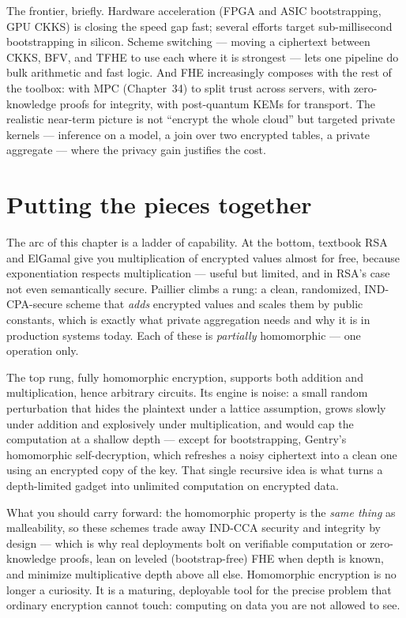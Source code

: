 \begin{focusbox}
The frontier, briefly. Hardware acceleration (FPGA and ASIC bootstrapping, GPU CKKS) is closing the speed gap fast; several efforts target sub-millisecond bootstrapping in silicon. Scheme switching --- moving a ciphertext between CKKS, BFV, and TFHE to use each where it is strongest --- lets one pipeline do bulk arithmetic and fast logic. And FHE increasingly composes with the rest of the toolbox: with MPC (Chapter~34) to split trust across servers, with zero-knowledge proofs for integrity, with post-quantum KEMs for transport. The realistic near-term picture is not ``encrypt the whole cloud'' but targeted private kernels --- inference on a model, a join over two encrypted tables, a private aggregate --- where the privacy gain justifies the cost.
\end{focusbox}

\section{Putting the pieces together}
\label{ch33:summary}

The arc of this chapter is a ladder of capability. At the bottom, textbook RSA and ElGamal give you multiplication of encrypted values almost for free, because exponentiation respects multiplication --- useful but limited, and in RSA's case not even semantically secure. Paillier climbs a rung: a clean, randomized, IND-CPA-secure scheme that \emph{adds} encrypted values and scales them by public constants, which is exactly what private aggregation needs and why it is in production systems today. Each of these is \emph{partially} homomorphic --- one operation only.

The top rung, fully homomorphic encryption, supports both addition and multiplication, hence arbitrary circuits. Its engine is noise: a small random perturbation that hides the plaintext under a lattice assumption, grows slowly under addition and explosively under multiplication, and would cap the computation at a shallow depth --- except for bootstrapping, Gentry's homomorphic self-decryption, which refreshes a noisy ciphertext into a clean one using an encrypted copy of the key. That single recursive idea is what turns a depth-limited gadget into unlimited computation on encrypted data.

What you should carry forward: the homomorphic property is the \emph{same thing} as malleability, so these schemes trade away IND-CCA security and integrity by design --- which is why real deployments bolt on verifiable computation or zero-knowledge proofs, lean on leveled (bootstrap-free) FHE when depth is known, and minimize multiplicative depth above all else. Homomorphic encryption is no longer a curiosity. It is a maturing, deployable tool for the precise problem that ordinary encryption cannot touch: computing on data you are not allowed to see.

